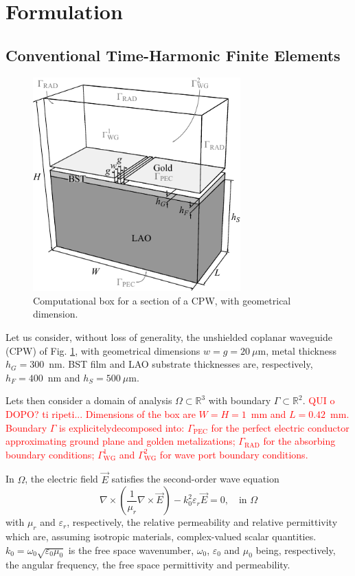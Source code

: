 \documentclass[AMA,STIX2COL]{WileyNJD-v2}
\begin{document}
\section{Formulation}
\subsection{Conventional Time-Harmonic Finite Elements}

\label{sec:FE}
\begin{figure}[t!]
\centering
\includegraphics[width=8cm]{CPW}
\caption{Computational box for a section of a CPW, with geometrical dimension.}
\label{fig:CPW}
\end{figure}

Let us consider, without loss of generality, the unshielded coplanar waveguide (CPW) of Fig. \ref{fig:CPW}, with geometrical dimensions $w = g = 20~{\mu}$m, metal  thickness  $h_G = 300$~nm. BST film and LAO substrate thicknesses are, respectively, $h_F = 400$~nm and $h_S = 500~{\mu}$m. 

Lets then consider a domain of analysis $\Omega \subset \mathbb{R}^3$ with boundary $\Gamma \subset \mathbb{R}^2$. \textcolor{red}{QUI o DOPO? ti ripeti... Dimensions of the box are $W = H = 1$~mm and $L=0.42$~mm. Boundary $\Gamma$ is explicitelydecomposed into:  $\Gamma_\text{PEC}$ for the perfect electric conductor approximating ground plane and golden metalizations; $\Gamma_\text{RAD}$ for the absorbing boundary conditions;  $\Gamma_\text{WG}^1$ and $\Gamma_\text{WG}^2$ for wave port boundary conditions.} 

In $\Omega$, the electric field $\vec{E}$ satisfies the second-order wave equation \cite{Pelosi2009}
%
\begin{equation}
\label{eq:helmholtz}
\nabla \times \left( \frac{1}{\mu_r} \nabla \times \vec{E} \right) - {k}_0^2 {\varepsilon}_r \vec{E} = 0, \quad \text{in } \Omega
\end{equation}
%
\noindent with ${\mu}_r$ and ${\varepsilon}_r$, respectively, the relative permeability and relative permittivity which are, assuming isotropic materials, complex-valued scalar quantities. $k_0 = \omega_0\sqrt{\varepsilon_0\mu_0}$ is the free space wavenumber, $\omega_0$, $\varepsilon_0$ and $\mu_0$ being, respectively, the angular frequency, the free space permittivity and permeability.
\end{document}
